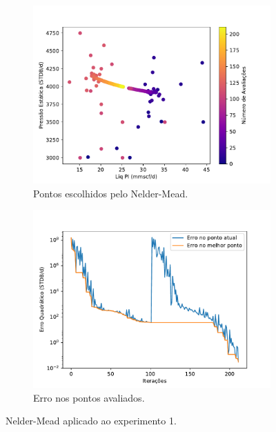 \begin{figure}
\centering
\begin{subfigure}{0.5\textwidth}
  \centering
  \includegraphics[width=1\linewidth]{figs/setup1nm_eval_points.pdf}
  \caption{Pontos escolhidos pelo Nelder-Mead.}
  \label{fig:setup3_points}
\end{subfigure}%
\begin{subfigure}{0.5\textwidth}
  \centering
  \includegraphics[width=1\linewidth]{figs/setup1nm_errors.pdf}
  \caption{Erro nos pontos avaliados.}
  \label{fig:setup3_error}
\end{subfigure}
\caption{Nelder-Mead aplicado ao experimento 1.}
\label{fig:setup3_2}
\end{figure}

